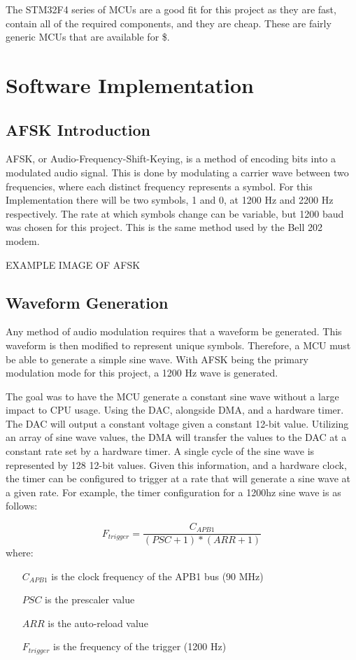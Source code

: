 \documentclass{journal}
\begin{document}
The STM32F4 series of MCUs are a good fit for this project as they are fast, contain all of the required components, and they are cheap. These are fairly generic MCUs that are available for \$.

\section{Software Implementation}
\subsection{AFSK Introduction}
AFSK, or Audio-Frequency-Shift-Keying, is a method of encoding bits into a modulated audio signal. This is done by modulating a carrier wave between two frequencies, where each distinct frequency represents a symbol. For this Implementation there will be two symbols, 1 and 0, at 1200 Hz and 2200 Hz respectively. The rate at which symbols change can be variable, but 1200 baud was chosen for this project. This is the same method used by the Bell 202 modem.

EXAMPLE IMAGE OF AFSK

\subsection{Waveform Generation}
Any method of audio modulation requires that a waveform be generated. This waveform is then modified to represent unique symbols. Therefore, a MCU must be able to generate a simple sine wave. With AFSK being the primary modulation mode for this project, a 1200 Hz wave is generated.

The goal was to have the MCU generate a constant sine wave without a large impact to CPU usage. Using the DAC, alongside DMA, and a hardware timer. The DAC will output a constant voltage given a constant 12-bit value. Utilizing an array of sine wave values, the DMA will transfer the values to the DAC at a constant rate set by a hardware timer. A single cycle of the sine wave is represented by 128 12-bit values. Given this information, and a hardware clock, the timer can be configured to trigger at a rate that will generate a sine wave at a given rate. For example, the timer configuration for a 1200hz sine wave is as follows:

\[
  F_{trigger} = \frac{C_{APB1}}{(PSC+1)*(ARR+1)}
\]
where:
\begin{itemize}
  \item[$C_{APB1}$] is the clock frequency of the APB1 bus (90 MHz)
  \item[$PSC$] is the prescaler value
  \item[$ARR$] is the auto-reload value
  \item[$F_{trigger}$] is the frequency of the trigger (1200 Hz)
\end{itemize}
\end{document}
